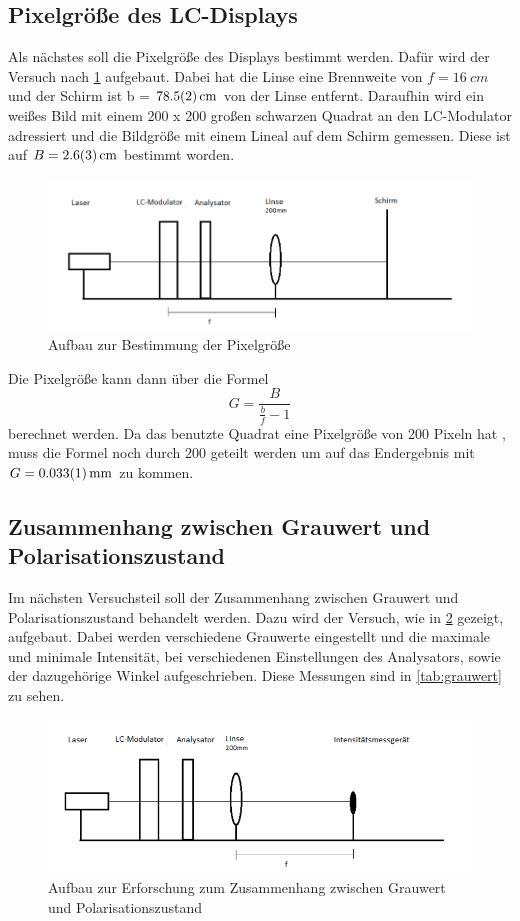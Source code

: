 \subsection{Pixelgröße des LC-Displays}
Als nächstes soll die Pixelgröße des Displays bestimmt werden. Dafür wird der Versuch nach \cref{413} aufgebaut. Dabei hat die Linse eine Brennweite von $f = \SI{16}{cm}$ und der Schirm ist b = $\SI{78,5 \pm 0,2}{cm}$ von der Linse entfernt. Daraufhin wird ein weißes Bild mit einem 200 x 200 großen schwarzen Quadrat an den LC-Modulator adressiert und die Bildgröße mit einem Lineal auf dem Schirm gemessen. Diese ist auf $B = \SI{2,6 \pm 0,3}{cm}$
bestimmt worden.
\begin{figure}[h!]
	\centering
	\includegraphics[scale=0.6]{4.1.3-Aufbau.png}
	\caption{Aufbau zur Bestimmung der Pixelgröße}
	\label{413}
\end{figure}

Die Pixelgröße kann dann über die Formel
\begin{equation}
	G = \frac{B}{\frac{b}{f} - 1} 
\end{equation}
berechnet werden. Da das benutzte Quadrat eine Pixelgröße von 200 Pixeln hat , muss die Formel noch durch 200 geteilt werden um  auf das Endergebnis mit $G = \SI{0,033 \pm 0,001}{mm}$ zu kommen. 

\subsection{Zusammenhang zwischen Grauwert und Polarisationszustand}
Im nächsten Versuchsteil soll der Zusammenhang zwischen Grauwert und Polarisationszustand behandelt werden. Dazu wird der Versuch, wie in \cref{414} gezeigt, aufgebaut. Dabei werden verschiedene Grauwerte eingestellt und die maximale und minimale Intensität, bei verschiedenen Einstellungen des Analysators, sowie der dazugehörige Winkel aufgeschrieben. Diese Messungen sind in \cref{tab:grauwert} zu sehen.


\begin{figure}[h!]
	\centering
	\includegraphics[scale=0.6]{4.1.4-Aufbau.png}
	\caption{Aufbau zur Erforschung zum Zusammenhang zwischen Grauwert und Polarisationszustand}
	\label{414}
\end{figure}

